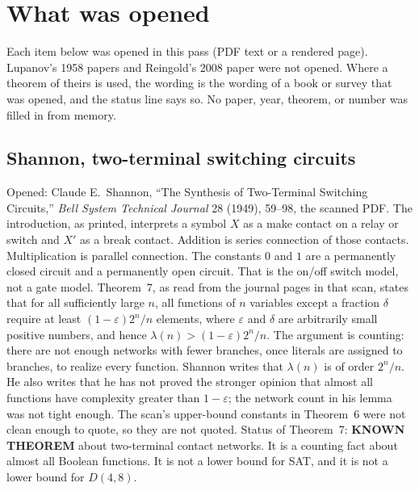\documentclass[11pt]{article}
\begin{document}
\section{What was opened}
Each item below was opened in this pass (PDF text or a rendered page).
Lupanov's 1958 papers and Reingold's 2008 paper were not opened.
Where a theorem of theirs is used, the wording is the wording of a book or survey that was opened, and the status line says so.
No paper, year, theorem, or number was filled in from memory.

\subsection*{Shannon, two-terminal switching circuits}
Opened: Claude E.\ Shannon, ``The Synthesis of Two-Terminal Switching Circuits,'' \emph{Bell System Technical Journal} 28 (1949), 59--98, the scanned PDF.
The introduction, as printed, interprets a symbol \(X\) as a make contact on a relay or switch and \(X'\) as a break contact.
Addition is series connection of those contacts.
Multiplication is parallel connection.
The constants \(0\) and \(1\) are a permanently closed circuit and a permanently open circuit.
That is the on/off switch model, not a gate model.
Theorem~7, as read from the journal pages in that scan, states that for all sufficiently large \(n\), all functions of \(n\) variables except a fraction \(\delta\) require at least \((1-\varepsilon)2^n/n\) elements, where \(\varepsilon\) and \(\delta\) are arbitrarily small positive numbers, and hence \(\lambda(n)>(1-\varepsilon)2^n/n\).
The argument is counting: there are not enough networks with fewer branches, once literals are assigned to branches, to realize every function.
Shannon writes that \(\lambda(n)\) is of order \(2^n/n\).
He also writes that he has not proved the stronger opinion that almost all functions have complexity greater than \(1-\varepsilon\); the network count in his lemma was not tight enough.
The scan's upper-bound constants in Theorem~6 were not clean enough to quote, so they are not quoted.
Status of Theorem~7: \textbf{KNOWN THEOREM} about two-terminal contact networks.
It is a counting fact about almost all Boolean functions.
It is not a lower bound for SAT, and it is not a lower bound for \(D(4,8)\).
\end{document}
